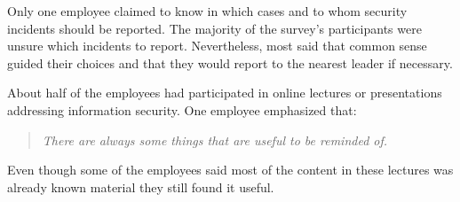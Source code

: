 Only one employee claimed to know in which cases and to whom security incidents should be reported. The majority of the survey's participants were unsure which incidents to report. Nevertheless, most said that common sense guided their choices and that they would report to the nearest leader if necessary.

About half of the employees had participated in online lectures or presentations addressing information security. One employee emphasized that:
\begin{quote}
\textit{There are always some things that are useful to be reminded of.}
\end{quote}
Even though some of the employees said most of the content in these lectures was already known material they still found it useful.